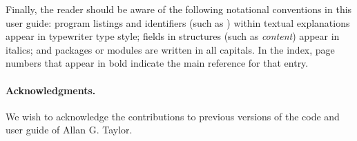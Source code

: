 Finally, the reader should be aware of the following notational
conventions in this user guide:  program listings and identifiers
(such as ) within textual explanations appear in
typewriter type style; fields in {\C} structures (such as {\em
content}) appear in italics; and packages or modules are written
in all capitals. In the index, page numbers that appear in bold
indicate the main reference for that entry.

\paragraph{Acknowledgments.}
We wish to acknowledge the contributions to previous versions of the
{\kinsol} code and user guide of Allan G. Taylor.
